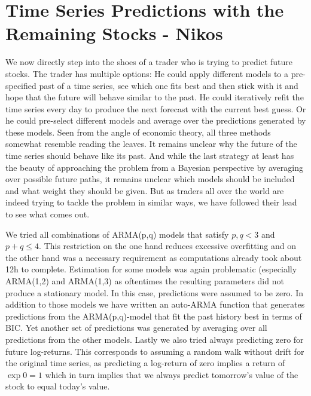 
\section{Time Series Predictions with the Remaining Stocks - Nikos}

We now directly step into the shoes of a trader who is trying to  predict future stocks. The trader has multiple options: He could apply different models to a pre-specified past of a time series, see which one fits best and then stick with it and hope that the future will behave similar to the past. He could iteratively refit the time series every day to produce the next forecast with the current best guess. Or he could pre-select different models and average over the predictions generated by these models. Seen from the angle of economic theory, all three methods somewhat resemble reading the leaves. It remains unclear why the future of the time series should behave like its past. And while the last strategy at least has the beauty of approaching the problem from a Bayesian perspective by averaging over possible future paths, it remains unclear which models should be included and what weight they should be given. But as traders all over the world are indeed trying to tackle the problem in similar ways, we have followed their lead to see what comes out. 

We tried all combinations of ARMA(p,q) models that satisfy $p,q < 3$ and $p+q \leq 4$. This restriction on the one hand reduces excessive overfitting and on the other hand was a necessary requirement as computations already took about 12h to complete. Estimation for some models was again problematic (especially ARMA(1,2) and ARMA(1,3) as oftentimes the resulting parameters did not produce a stationary model. In this case, predictions were assumed to be zero. In addition to those models we have written an auto-ARMA function that generates predictions from the ARMA(p,q)-model that fit the past history best in terms of BIC. Yet another set of predictions was generated by averaging over all predictions from the other models. Lastly we also tried always predicting zero for future log-returns. This corresponds to assuming a random walk without drift for the original time series, as predicting a log-return of zero implies a return of $\exp{0} = 1$ which in turn implies that we always predict tomorrow's value of the stock to equal today's value. 


